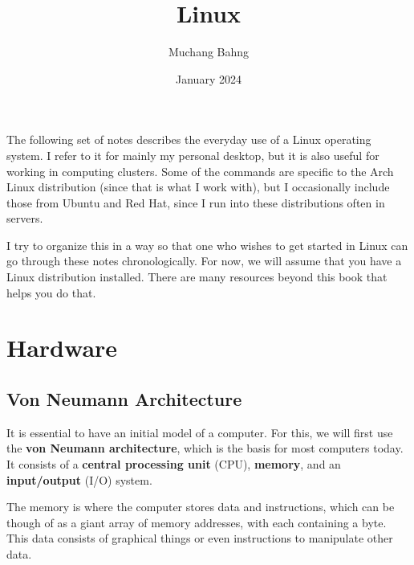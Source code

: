 \documentclass{article}
\begin{document}
\title{Linux}
\author{Muchang Bahng}
\date{January 2024}

\maketitle

\tableofcontents

\pagebreak 

The following set of notes describes the everyday use of a Linux operating system. I refer to it for mainly my personal desktop, but it is also useful for working in computing clusters. Some of the commands are specific to the Arch Linux distribution (since that is what I work with), but I occasionally include those from Ubuntu and Red Hat, since I run into these distributions often in servers. 

I try to organize this in a way so that one who wishes to get started in Linux can go through these notes chronologically. For now, we will assume that you have a Linux distribution installed. There are many resources beyond this book that helps you do that. 
 
\section{Hardware} 

  \subsection{Von Neumann Architecture}

    It is essential to have an initial model of a computer. For this, we will first use the \textbf{von Neumann architecture}, which is the basis for most computers today. It consists of a \textbf{central processing unit} (CPU), \textbf{memory}, and an \textbf{input/output} (I/O) system.

    \begin{definition}[Memory]
      The memory is where the computer stores data and instructions, which can be though of as a giant array of memory addresses, with each containing a byte. This data consists of graphical things or even instructions to manipulate other data.
    \end{definition}
\end{document}
